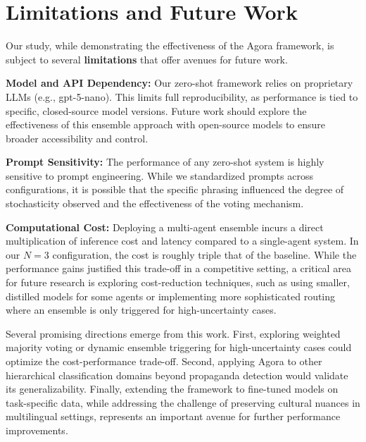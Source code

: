 \section{Limitations and Future Work}


Our study, while demonstrating the effectiveness of the Agora framework, is subject to several \textbf{limitations} that offer avenues for future work.

\textbf{Model and API Dependency:} Our zero-shot framework relies on proprietary LLMs (e.g., gpt-5-nano). This limits full reproducibility, as performance is tied to specific, closed-source model versions. Future work should explore the effectiveness of this ensemble approach with open-source models to ensure broader accessibility and control.

\textbf{Prompt Sensitivity:} The performance of any zero-shot system is highly sensitive to prompt engineering. While we standardized prompts across configurations, it is possible that the specific phrasing influenced the degree of stochasticity observed and the effectiveness of the voting mechanism.

\textbf{Computational Cost:} Deploying a multi-agent ensemble incurs a direct multiplication of inference cost and latency compared to a single-agent system. In our $N=3$ configuration, the cost is roughly triple that of the baseline. While the performance gains justified this trade-off in a competitive setting, a critical area for future research is exploring cost-reduction techniques, such as using smaller, distilled models for some agents or implementing more sophisticated routing where an ensemble is only triggered for high-uncertainty cases.


Several promising directions emerge from this work. First, exploring weighted majority voting or dynamic ensemble triggering for high-uncertainty cases could optimize the cost-performance trade-off. Second, applying Agora to other hierarchical classification domains beyond propaganda detection would validate its generalizability. Finally, extending the framework to fine-tuned models on task-specific data, while addressing the challenge of preserving cultural nuances in multilingual settings, represents an important avenue for further performance improvements.
